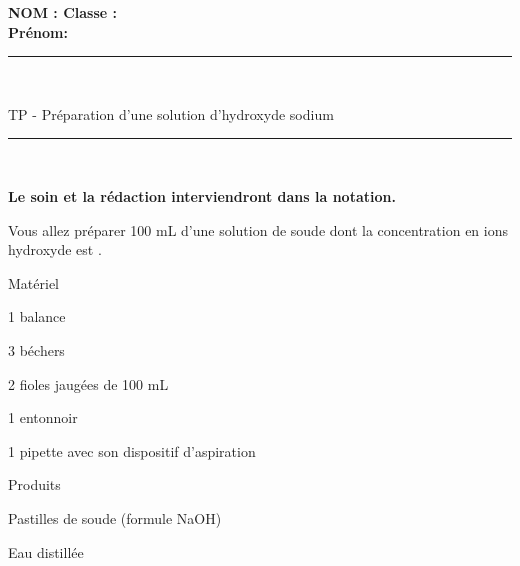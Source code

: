\documentclass[11pt,a4paper]{article}
\newenvironment{itemize*}%
    {\begin{itemize}%
      \setlength{\itemsep}{0pt}%
      \setlength{\parskip}{0pt}}%
    {\end{itemize}}
\begin{document}
\flushleft \textbf{NOM : \hfill Classe : \hspace{3cm} ~~\\[2mm]
Prénom:\\[0,4cm]
}
\hrule\
\\[0,2cm]

\begin{center}
 \LARGE{TP - Préparation d'une solution d'hydroxyde sodium    }
\end{center}

\vspace{3 mm}

\normalsize

\hrule\
\\[0,2cm]
   \begin{center}
   \textbf{Le soin et la rédaction interviendront dans la notation.}
   \end{center} 

   Vous allez préparer 100 mL d'une solution de soude dont la concentration en ions hydroxyde   est  . 
   
\noindent%
\begin{minipage}{.45\textwidth}%

    
 \begin{bclogo}[couleur=white,  arrondi =0.1 , logo = \bcinfo, epBarre =2]{ Matériel }

\begin{itemize*}
    \item 1 balance
    \item 3 béchers
    \item 2 fioles jaugées de 100 mL
    \item 1 entonnoir
    \item 1 pipette avec son dispositif d'aspiration
\end{itemize*}
\end{bclogo}




\end{minipage}%
\hfill
\begin{minipage}{.45\textwidth}%
    
 \begin{bclogo}[couleur=white,  arrondi =0.1 , logo = \bcinfo, epBarre =2]{ Produits }

\begin{itemize*}
    \item Pastilles de soude (formule NaOH)
    \item Eau distillée

\end{itemize*}
\end{bclogo}
\end{minipage}%
\end{document}
